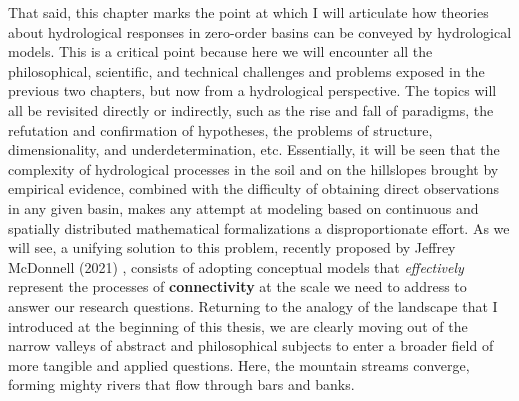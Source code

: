 \documentclass[./main_en.tex]{subfiles}
\begin{document}
\par That said, this chapter marks the point at which I will articulate how theories about hydrological responses in zero-order basins can be conveyed by hydrological models. This is a critical point because here we will encounter all the philosophical, scientific, and technical challenges and problems exposed in the previous two chapters, but now from a hydrological perspective. The topics will all be revisited directly or indirectly, such as the rise and fall of paradigms, the refutation and confirmation of hypotheses, the problems of structure, dimensionality, and underdetermination, etc. Essentially, it will be seen that the complexity of hydrological processes in the soil and on the hillslopes brought by empirical evidence, combined with the difficulty of obtaining direct observations in any given basin, makes any attempt at modeling based on continuous and spatially distributed mathematical formalizations a disproportionate effort. As we will see, a unifying solution to this problem, recently proposed by Jeffrey McDonnell (2021) \cite{mcdonnell2021}, consists of adopting conceptual models that \textit{effectively} represent the processes of \textbf{connectivity} at the scale we need to address to answer our research questions. Returning to the \gls{analogy} of the landscape that I introduced at the beginning of this thesis, we are clearly moving out of the narrow valleys of abstract and philosophical subjects to enter a broader field of more tangible and applied questions. Here, the mountain streams converge, forming mighty rivers that flow through bars and banks.
\end{document}
